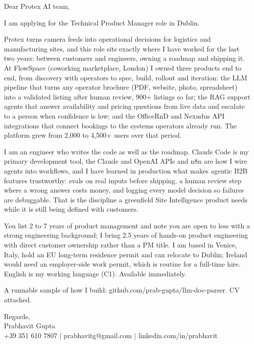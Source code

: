 \documentclass[a4paper,11pt]{article}
\begin{document}
Dear Protex AI team,

I am applying for the Technical Product Manager role in Dublin.

Protex turns camera feeds into operational decisions for logistics and manufacturing sites, and this role sits exactly where I have worked for the last two years: between customers and engineers, owning a roadmap and shipping it. At FlowSpace (coworking marketplace, London) I owned three products end to end, from discovery with operators to spec, build, rollout and iteration: the LLM pipeline that turns any operator brochure (PDF, website, photo, spreadsheet) into a validated listing after human review, 900+ listings so far; the RAG support agents that answer availability and pricing questions from live data and escalate to a person when confidence is low; and the OfficeRnD and Nexudus API integrations that connect bookings to the systems operators already run. The platform grew from 2,000 to 4,500+ users over that period.

I am an engineer who writes the code as well as the roadmap. Claude Code is my primary development tool, the Claude and OpenAI APIs and n8n are how I wire agents into workflows, and I have learned in production what makes agentic B2B features trustworthy: evals on real inputs before shipping, a human review step where a wrong answer costs money, and logging every model decision so failures are debuggable. That is the discipline a greenfield Site Intelligence product needs while it is still being defined with customers.

You list 2 to 7 years of product management and note you are open to less with a strong engineering background; I bring 2.5 years of hands-on product engineering with direct customer ownership rather than a PM title. I am based in Venice, Italy, hold an EU long-term residence permit and can relocate to Dublin; Ireland would need an employer-side work permit, which is routine for a full-time hire. English is my working language (C1). Available immediately.

A runnable sample of how I build: github.com/prab-gupta/llm-doc-parser. CV attached.

Regards,\\
Prabhavit Gupta\\
+39 351 610 7807 $\vert$ prabhavitg@gmail.com $\vert$ linkedin.com/in/prabhavit
\end{document}
